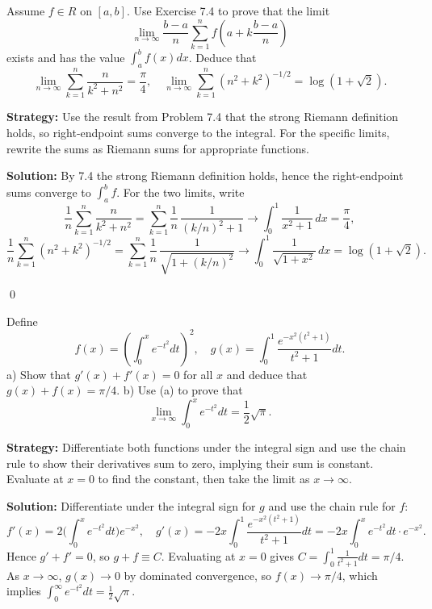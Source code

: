 \begin{problembox}
\begin{problemstatement}
Assume $f \in R$ on $[a, b]$. Use Exercise 7.4 to prove that the limit 
\[\lim_{n \to \infty} \frac{b - a}{n} \sum_{k=1}^{n} f \left( a + k \frac{b - a}{n} \right)\]
exists and has the value $\int_a^b f(x) dx$. Deduce that 
\[\lim_{n \to \infty} \sum_{k=1}^{n} \frac{n}{k^2 + n^2} = \frac{\pi}{4}, \quad \lim_{n \to \infty} \sum_{k=1}^{n} (n^2 + k^2)^{-1/2} = \log (1 + \sqrt{2}).\]
\end{problemstatement}
\end{problembox}

\noindent\textbf{Strategy:} Use the result from Problem 7.4 that the strong Riemann definition holds, so right-endpoint sums converge to the integral. For the specific limits, rewrite the sums as Riemann sums for appropriate functions.

\bigskip\noindent\textbf{Solution:}
By 7.4 the strong Riemann definition holds, hence the right-endpoint sums converge to $\int_a^b f$. For the two limits, write
\[\frac{1}{n}\sum_{k=1}^n \frac{n}{k^2+n^2}=\sum_{k=1}^n \frac{1}{n}\,\frac{1}{(k/n)^2+1}\to \int_0^1 \frac{1}{x^2+1}\,dx=\frac{\pi}{4},\]
\[\frac{1}{n}\sum_{k=1}^n (n^2+k^2)^{-1/2}=\sum_{k=1}^n \frac{1}{n}\,\frac{1}{\sqrt{1+(k/n)^2}}\to \int_0^1 \frac{1}{\sqrt{1+x^2}}\,dx=\log(1+\sqrt2).
\]




\qed
\begin{problembox}
\begin{problemstatement}
Define 
\[f(x) = \left( \int_0^x e^{-t^2} dt \right)^2, \quad g(x) = \int_0^1 \frac{e^{-x^2(t^2+1)}}{t^2 + 1} dt.\]
a) Show that $g'(x) + f'(x) = 0$ for all $x$ and deduce that $g(x) + f(x) = \pi / 4$.
b) Use (a) to prove that 
\[\lim_{x \to \infty} \int_0^x e^{-t^2} dt = \frac{1}{2} \sqrt{\pi}.\]
\end{problemstatement}
\end{problembox}

\noindent\textbf{Strategy:} Differentiate both functions under the integral sign and use the chain rule to show their derivatives sum to zero, implying their sum is constant. Evaluate at $x = 0$ to find the constant, then take the limit as $x \to \infty$.

\bigskip\noindent\textbf{Solution:}
Differentiate under the integral sign for $g$ and use the chain rule for $f$:
\[f'(x)=2\Big(\int_0^x e^{-t^2}dt\Big)e^{-x^2},\quad g'(x)=-2x\int_0^1 \frac{e^{-x^2(t^2+1)}}{t^2+1}dt=-2x\int_0^x e^{-t^2}dt\cdot e^{-x^2}.
\]
Hence $g'+f'=0$, so $g+f\equiv C$. Evaluating at $x=0$ gives $C=\int_0^1\frac{1}{t^2+1}dt=\pi/4$. As $x\to\infty$, $g(x)\to0$ by dominated convergence, so $f(x)\to \pi/4$, which implies $\int_0^\infty e^{-t^2}dt=\tfrac12\sqrt\pi$.




